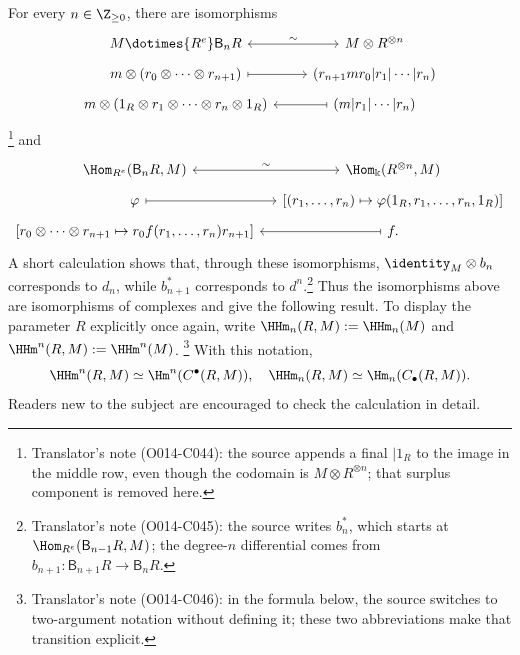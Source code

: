 For every $n\in\Z_{\geq0}$, there are isomorphisms
\[\begin{tikzcd}[row sep=tiny]
	M \dotimes{R^e} \mathsf{B}_n R \arrow[leftrightarrow, r, "\sim"]
	& M \otimes R^{\otimes n} \\
	m \otimes (r_0 \otimes \cdots \otimes r_{n+1}) \arrow[mapsto, r]
	& (r_{n+1} m r_0 | r_1 | \cdots | r_n) \\
	m \otimes (1_R \otimes r_1 \otimes \cdots \otimes r_n \otimes 1_R )
	& (m | r_1 | \cdots | r_n) \arrow[mapsto, l]
\end{tikzcd}\]
\footnote{Translator's note (O014-C044): the source appends a final
$|1_R$ to the image in the middle row, even though the codomain is
$M\otimes R^{\otimes n}$; that surplus component is removed here.}
and
\[\begin{tikzcd}[row sep=tiny, column sep=small]
	\Hom_{R^e}(\mathsf{B}_nR, M) \arrow[leftrightarrow, r, "\sim"]
	& \Hom_{\Bbbk}(R^{\otimes n}, M) \\
	\varphi \arrow[mapsto, r]
	& {\left[(r_1,\ldots,r_n)\mapsto
		\varphi(1_R,r_1,\ldots,r_n,1_R)\right]} \\
	{\left[r_0\otimes\cdots\otimes r_{n+1}\mapsto
		r_0f(r_1,\ldots,r_n)r_{n+1}\right]}
	& f \arrow[mapsto, l] .
\end{tikzcd}\]
A short calculation shows that, through these isomorphisms,
$\identity_M\otimes b_n$ corresponds to $d_n$, while $b_{n+1}^*$
corresponds to $d^n$.\footnote{Translator's note (O014-C045): the source
writes $b_n^*$, which starts at $\Hom_{R^e}(\mathsf{B}_{n-1}R,M)$; the
degree-$n$ differential comes from
$b_{n+1}:\mathsf{B}_{n+1}R\to\mathsf{B}_nR$.}
Thus the isomorphisms above are isomorphisms of complexes and give the
following result. To display the parameter $R$ explicitly once again, write
$\HHm_n(R,M):=\HHm_n(M)$ and $\HHm^n(R,M):=\HHm^n(M)$.
\footnote{Translator's note (O014-C046): in the formula below, the source
switches to two-argument notation without defining it; these two
abbreviations make that transition explicit.} With this notation,
\[ \HHm^n(R, M) \simeq \Hm^n(C^\bullet(R, M)), \quad
	\HHm_n(R, M) \simeq \Hm_n(C_\bullet(R, M)). \]
Readers new to the subject are encouraged to check the calculation in
detail.

